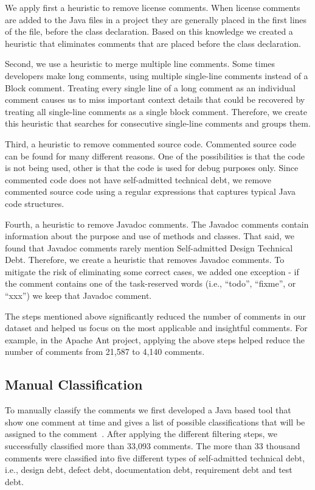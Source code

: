 We apply first a heuristic to remove license comments. When license comments are added to the Java files in a project they are generally placed in the first lines of the file, before the class declaration. Based on this knowledge we created a heuristic that eliminates comments that are placed before the class declaration. 

Second, we use a heuristic to merge multiple line comments. Some times developers make long comments, using multiple single-line comments instead of a Block comment. Treating every single line of a long comment as an individual comment causes us to miss important context details that could be recovered by treating all single-line comments as a single block comment. Therefore, we create this heuristic that searches for consecutive single-line comments and groups them.

Third, a heuristic to remove commented source code. Commented source code can be found for many different reasons. One of the possibilities is that the code is not being used, other is that the code is used for debug purposes only. Since commented code does not have self-admitted technical debt, we remove commented source code using a regular expressions that captures typical Java code structures.

Fourth, a heuristic to remove Javadoc comments. The Javadoc comments contain information about the purpose and use of methods and classes. That said, we found that Javadoc comments rarely mention Self-admitted Design Technical Debt. Therefore, we create a heuristic that removes Javadoc comments. To mitigate the risk of eliminating some correct cases, we added one exception - if the comment contains one of the task-reserved words (i.e., ``todo'', ``fixme'', or ``xxx'') we keep that Javadoc comment. 

The steps mentioned above significantly reduced the number of comments in our dataset and helped us focus on the most applicable and insightful comments. For example, in the Apache Ant project, applying the above steps helped reduce the number of comments from 21,587 to 4,140 comments.


\subsection{Manual Classification} %
\label{sub:manual_classification}

To manually classify the comments we first developed a Java based tool that show one comment at time and gives a list of possible classifications  that will be assigned to the comment~\cite{Alves2014MTD}. After applying the different filtering steps, we successfully classified more than  33,093 comments. The more than 33 thousand comments were classified into five different types of self-admitted technical debt, i.e., design debt, defect debt, documentation debt, requirement debt and test debt.

